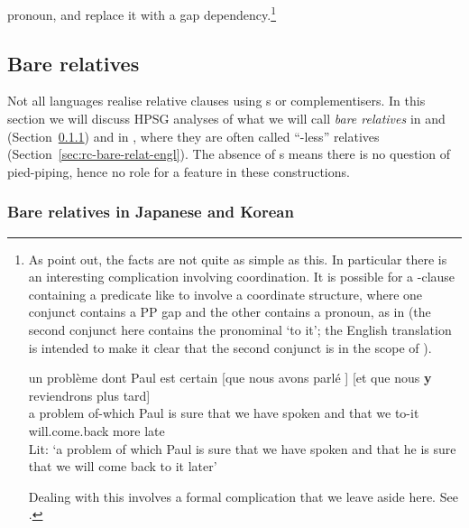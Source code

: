 \documentclass[output=paper,nonflat,draftmode]{./langsci/langscibook}
\begin{document}
pronoun, and replace it with a gap dependency.\footnote{As \cite{AbeilleGodard07} point
  out, the facts are not quite as simple as this. In particular there is an interesting
  complication involving coordination. It is possible for a -clause containing a
  predicate like  to involve a coordinate structure, where one conjunct
  contains a PP gap and the other contains a pronoun, as in  (the
  second conjunct here contains the pronominal  `to it'; the English translation is
  intended to make it clear that the second conjunct is in the scope of ).
  \begin{exe}\ex\label{x:rc-80}\gll
    un problème dont         Paul est certain [que nous avons parlé  \uGap] [et que nous \textbf{y} reviendrons plus tard]\\
    a     problem   of-which Paul is   sure      \hspaceThis{[}that we have 
    spoken  \hspaceThis{[}and that we to-it will.come.back more late\\
    \glt Lit: `a problem of which Paul is sure that we have  spoken and that
    he is sure that we will come back to it later'
  \end{exe}
  Dealing with this
  involves a formal complication that we leave aside here. See \cite{AbeilleGodard07}.}


\subsection{Bare relatives}
\label{sec:rc-bare-relatives}

Not all languages realise relative clauses using s or complementisers. In this section we
will discuss HPSG analyses of what we will call \emph{bare relatives} in  and 
(Section~\ref{sec:rc-bare-relat-japan}) and in , where they are often called
``-less'' relatives (Section~\ref{sec:rc-bare-relat-engl}).  The absence of s means there is no question of pied-piping, hence no role for a 
feature in these constructions.

\subsubsection{Bare relatives in Japanese and Korean}
\label{sec:rc-bare-relat-japan}
\end{document}
